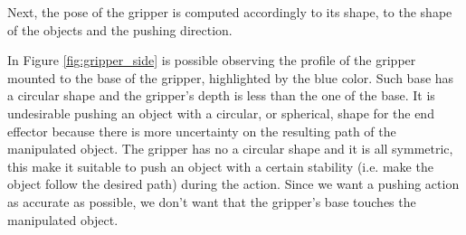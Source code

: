 
Next, the pose of the gripper is computed accordingly to its shape, to the shape of the objects and the pushing direction.


In Figure \ref{fig:gripper_side}
is possible observing the profile of the gripper mounted to the base of the gripper, highlighted by the blue color. Such base has a circular shape and the gripper's depth is less than the one of the base. It is undesirable pushing an object with a circular, or spherical, shape for the end effector because there is more uncertainty on the resulting path of the manipulated object. The gripper has no a circular shape and it is all symmetric, this make it suitable to push an object with a certain stability (i.e. make the object follow the desired path) during the action. Since we want a pushing action as accurate as possible, we don't want that the gripper's base touches the manipulated object. 

